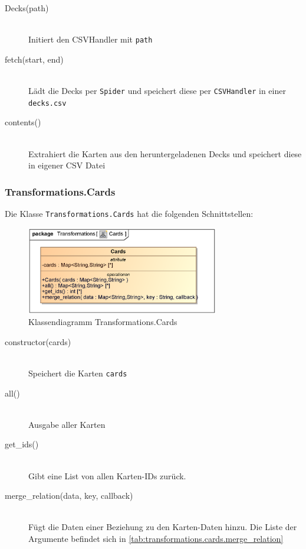 \begin{description}
    \item[Decks(path)] \hfill \\
    Initiert den CSVHandler mit \verb|path|
    
    \item[fetch(start, end)] \hfill \\
    Lädt die Decks per \verb|Spider| und speichert diese per \verb|CSVHandler| in einer \verb|decks.csv|
    
    \item[contents()] \hfill \\
    Extrahiert die Karten aus den heruntergeladenen Decks und speichert diese in eigener \ac{CSV} Datei
\end{description}

\subsubsection{Transformations.Cards}
Die Klasse \verb|Transformations.Cards| hat die folgenden Schnittstellen:

\begin{figure}[H]
    \myfloatalign
    \includegraphics[width=0.75\textwidth]{gfx/MtGDeepAnalysis/Card_Transformations.eps}
    \caption{Klassendiagramm Transformations.Cards}
    \label{fig:class:transformations.cards}
\end{figure}

\begin{description}
    \item[constructor(cards)] \hfill \\
    Speichert die Karten \verb|cards|
    
    \item[all()] \hfill \\
    Ausgabe aller Karten
    
    \item[get\_ids()] \hfill \\
    Gibt eine List von allen Karten-IDs zurück.
    
    \item[merge\_relation(data, key, callback)] \hfill \\
    Fügt die Daten einer Beziehung zu den Karten-Daten hinzu. Die Liste der Argumente befindet sich in \autoref{tab:transformations.cards.merge_relation}
\end{description}

